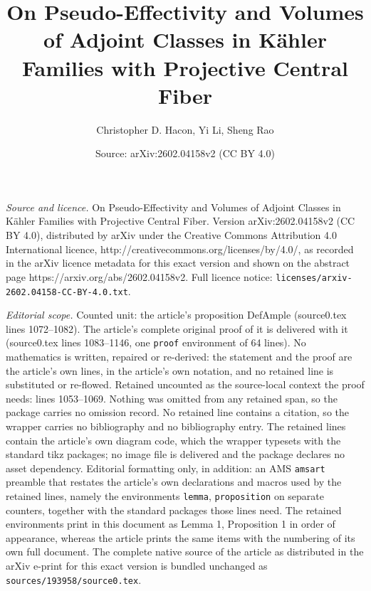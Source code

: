 \documentclass[10pt,a4paper]{amsart}
\title{On Pseudo-Effectivity and Volumes of Adjoint Classes in K\"ahler Families with Projective Central Fiber}
\author{Christopher D. Hacon, Yi Li, Sheng Rao}
\date{Source: arXiv:2602.04158v2 (CC BY 4.0)}
\begin{document}
\maketitle

\noindent\emph{Source and licence.} On Pseudo-Effectivity and Volumes of Adjoint Classes in K\"ahler Families with Projective Central Fiber. Version arXiv:2602.04158v2 (CC BY 4.0), distributed by arXiv under the Creative Commons Attribution 4.0 International licence, http://creativecommons.org/licenses/by/4.0/, as recorded in the arXiv licence metadata for this exact version and shown on the abstract page https://arxiv.org/abs/2602.04158v2. Full licence notice: \texttt{licenses/arxiv-2602.04158-CC-BY-4.0.txt}.\par\smallskip

\noindent\textit{Editorial scope.} Counted unit: the article's proposition DefAmple (source0.tex lines 1072--1082). The article's complete original proof of it is delivered with it (source0.tex lines 1083--1146, one \texttt{proof} environment of 64 lines). No mathematics is written, repaired or re-derived: the statement and the proof are the article's own lines, in the article's own notation, and no retained line is substituted or re-flowed.  Retained uncounted as the source-local context the proof needs: lines 1053--1069.  Nothing was omitted from any retained span, so the package carries no omission record.  No retained line contains a citation, so the wrapper carries no bibliography and no bibliography entry.  The retained lines contain the article's own diagram code, which the wrapper typesets with the standard tikz packages; no image file is delivered and the package declares no asset dependency.  Editorial formatting only, in addition: an AMS \texttt{amsart} preamble that restates the article's own declarations and macros used by the retained lines, namely the environments \texttt{lemma}, \texttt{proposition} on separate counters, together with the standard packages those lines need.  The retained environments print in this document as Lemma 1, Proposition 1 in order of appearance, whereas the article prints the same items with the numbering of its own full document.  The complete native source of the article as distributed in the arXiv e-print for this exact version is bundled unchanged as \texttt{sources/193958/source0.tex}.
\end{document}
